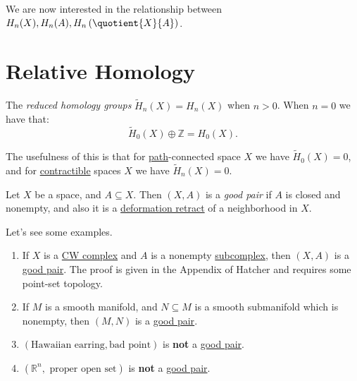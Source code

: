We are now interested in the relationship between \(H_{n}(X), H_{n} (A), H_{n} \left(\quotient{X}{A}\right)\).

\section{Relative Homology}
\begin{definition}\label{def:reduced-homology-group}
	The \emph{reduced homology groups} \(\widetilde{H}_n(X) = H_n(X)\) when \(n > 0\). When \(n = 0\) we have that:
	\[
		\widetilde{H}_0(X) \oplus \mathbb{Z} = H_0(X).
	\]
\end{definition}
\begin{remark}
	The usefulness of this is that for \hyperref[def:path]{path}-connected space \(X\) we have \(\widetilde{H}_0(X) = 0\), and for
	\hyperref[def:contractible]{contractible} spaces \(X\) we have \(\widetilde{H}_n(X) = 0\).
\end{remark}

\begin{definition}\label{def:good-pair}
	Let \(X\) be a space, and \(A \subseteq X\). Then \((X, A)\) is a \emph{good pair} if \(A\) is closed and nonempty, and also it is a
	\hyperref[def:deformation-retraction]{deformation retract} of a neighborhood in \(X\).
\end{definition}

\begin{eg}
	Let's see some examples.
	\begin{enumerate}[(1)]
		\item If \(X\) is a \hyperref[def:CW-Complex]{CW complex} and \(A\) is a nonempty \hyperref[def:CW-subcomplex]{subcomplex}, then \((X, A)\)
		      is a \hyperref[def:good-pair]{good pair}. The proof is given in the Appendix of Hatcher\cite{hatcher2002algebraic} and requires some
		      point-set topology.
		\item If \(M\) is a smooth manifold, and \(N\subseteq M\) is a smooth submanifold which is nonempty, then \((M, N)\) is a \hyperref[def:good-pair]{good pair}.
		\item \((\text{Hawaiian earring}, \text{bad point})\) is \textbf{not} a \hyperref[def:good-pair]{good pair}.
		\item \((\mathbb{R} ^n, \text{ proper open set})\) is \textbf{not} a \hyperref[def:good-pair]{good pair}.
	\end{enumerate}
\end{eg}

